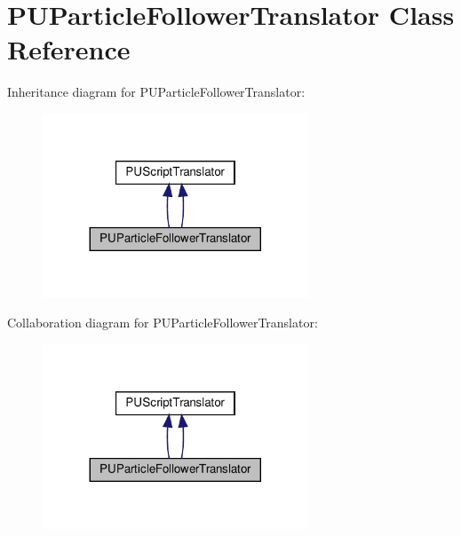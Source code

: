 \hypertarget{classPUParticleFollowerTranslator}{}\section{P\+U\+Particle\+Follower\+Translator Class Reference}
\label{classPUParticleFollowerTranslator}


Inheritance diagram for P\+U\+Particle\+Follower\+Translator\+:
\nopagebreak
\begin{figure}[H]
\begin{center}
\leavevmode
\includegraphics[width=224pt]{classPUParticleFollowerTranslator__inherit__graph}
\end{center}
\end{figure}


Collaboration diagram for P\+U\+Particle\+Follower\+Translator\+:
\nopagebreak
\begin{figure}[H]
\begin{center}
\leavevmode
\includegraphics[width=224pt]{classPUParticleFollowerTranslator__coll__graph}
\end{center}
\end{figure}
